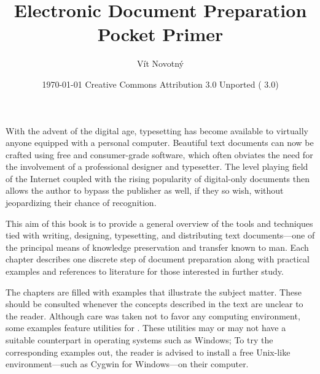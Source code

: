 \documentclass[
  a5paper,10pt,           %
  dvipsnames              %
]{book}
\begin{document}
\frontmatter
\title{Electronic Document Preparation\\Pocket Primer}
\author{Vít Novotný}
\date{\today\vfill\small{}\enspace
  Creative Commons Attribution 3.0 Unported (  3.0)}
\maketitle
\tableofcontents
\mainmatter
{}
With the advent of the digital age, typesetting has become available to
virtually anyone equipped with a personal computer. Beautiful text documents can
now be crafted using free and consumer-grade software, which often obviates the
need for the involvement of a professional designer and typesetter. The level
playing field of the Internet coupled with the rising popularity of digital-only
documents then allows the author to bypass the publisher as well, if they so
wish, without jeopardizing their chance of recognition.

This aim of this book is to provide a general overview of the tools and
techniques tied with writing, designing, typesetting, and distributing text
documents---one of the principal means of knowledge preservation and transfer
known to man. Each chapter describes one discrete step of document preparation
along with practical examples and references to literature for those interested
in further study.

The chapters are filled with examples that illustrate the subject matter. These
should be consulted whenever the concepts described in the text are unclear to
the reader. Although care was taken not to favor any computing environment,
some examples feature utilities for \Unices. These utilities may or may not have
a suitable counterpart in operating systems such as Windows; To try the
corresponding examples out, the reader is advised to install a free Unix-like
environment---such as Cygwin for Windows---on their computer.






\backmatter

\def\cite#1{$\!$}                    %
\printbibliography[heading=bibintoc] %

\def\index#1{} %
\printacronyms[heading=none]

\cleardoublepage
\def\index#1{} %
\printindex    %
\end{document}

